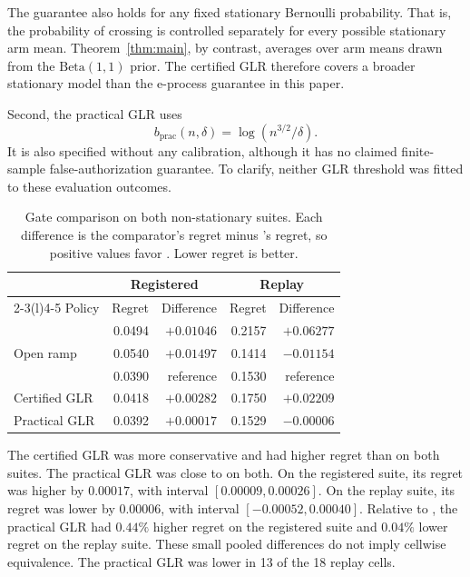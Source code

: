 The guarantee also holds for any fixed stationary Bernoulli probability.
That is, the probability of crossing is controlled separately for every
possible stationary arm mean.
Theorem~\ref{thm:main}, by contrast, averages over arm means drawn from the $\mathrm{Beta}(1,1)$ prior.
The certified GLR therefore covers a broader stationary model than the e-process guarantee in
this paper.

Second, the practical GLR uses
\[
 b_{\mathrm{prac}}(n,\delta)
 =
 \log(n^{3/2}/\delta).
\]
It is also specified without any calibration, although it has no claimed
finite-sample false-authorization guarantee.
To clarify, neither GLR threshold was fitted to these evaluation outcomes.

\begin{table}[H]
\centering
\small
\caption{Gate comparison on both non-stationary suites. Each difference is
the comparator's regret minus \method{}'s regret, so positive values favor \method{}. Lower regret is better.}
\label{tab:gate-both-suites}
\begin{tabular}{@{}lrrrr@{}}
\toprule
& \multicolumn{2}{c}{Registered}
& \multicolumn{2}{c}{Replay} \\
\cmidrule(lr){2-3}\cmidrule(l){4-5}
Policy & Regret & Difference & Regret & Difference \\
\midrule
\anchor{}       & 0.0494 & $+0.01046$ & 0.2157 & $+0.06277$ \\
Open ramp       & 0.0540 & $+0.01497$ & 0.1414 & $-0.01154$ \\
\method{}       & 0.0390 & reference  & 0.1530 & reference \\
Certified GLR   & 0.0418 & $+0.00282$ & 0.1750 & $+0.02209$ \\
Practical GLR   & 0.0392 & $+0.00017$ & 0.1529 & $-0.00006$ \\
\bottomrule
\end{tabular}
\end{table}

The certified GLR was more conservative and had higher regret than \method{}
on both suites.
The practical GLR was close to \method{} on both.
On the registered suite, its regret was higher by $0.00017$, with interval
$[0.00009,0.00026]$.
On the replay suite, its regret was lower by $0.00006$,
with interval $[-0.00052,0.00040]$.
Relative to \method{}, the practical GLR had $0.44\%$ higher regret on the
registered suite and $0.04\%$ lower regret on the replay suite.
These small pooled differences do not imply cellwise equivalence.
The practical GLR was lower in 13 of the 18 replay cells.


